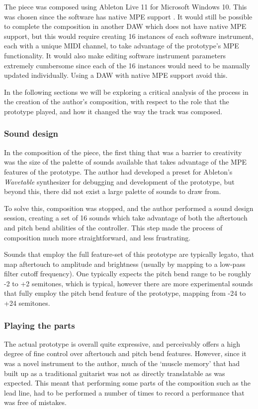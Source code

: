 The piece was composed using Ableton Live 11 for Microsoft Windows 10. This was chosen since the software has native MPE support \citep{ableton_mpe_2021}. It would still be possible to complete the composition in another DAW which does not have native MPE support, but this would require creating 16 instances of each software instrument, each with a unique MIDI channel, to take advantage of the prototype's MPE functionality. It would also make editing software instrument parameters extremely cumbersome since each of the 16 instances would need to be manually updated individually. Using a DAW with native MPE support avoid this. 

In the following sections we will be exploring a critical analysis of the process in the creation of the author's composition, with respect to the role that the prototype played, and how it changed the way the track was composed. 

\subsubsection{Sound design}
In the composition of the piece, the first thing that was a barrier to creativity was the size of the palette of sounds available that takes advantage of the MPE features of the prototype. The author had developed a preset for Ableton's \textit{Wavetable} synthesizer for debugging and development of the prototype, but beyond this, there did not exist a large palette of sounds to draw from. 

To solve this, composition was stopped, and the author performed a sound design session, creating a set of 16 sounds which take advantage of both the aftertouch and pitch bend abilities of the controller. This step made the process of composition much more straightforward, and less frustrating. 

Sounds that employ the full feature-set of this prototype are typically legato, that map aftertouch to amplitude and brightness (usually by mapping to a low-pass filter cutoff frequency). One typically expects the pitch bend range to be roughly -2 to +2 semitones, which is typical, however there are more experimental sounds that fully employ the pitch bend feature of the prototype, mapping from -24 to +24 semitones. 

\subsubsection{Playing the parts}
The actual prototype is overall quite expressive, and perceivably offers a high degree of fine control over aftertouch and pitch bend features. However, since it was a novel instrument to the author, much of the `muscle memory' that had built up as a traditional guitarist was not as directly translatable as was expected. This meant that performing some parts of the composition such as the lead line, had to be performed a number of times to record a performance that was free of mistakes. 

